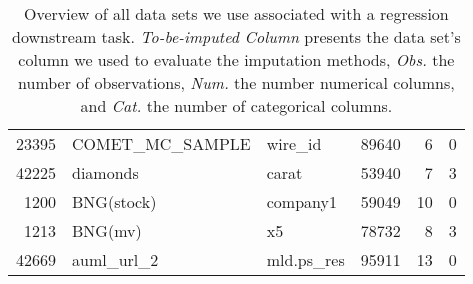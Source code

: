 \begin{table}[h!]
\begin{tabular}{rllrrr}
     23395 &     COMET\_MC\_SAMPLE &   wire\_id &     89640 &                6 &                0 \\
     42225 &            diamonds &    carat &    53940 &                7 &                3 \\
      1200 &          BNG(stock) &  company1 &      59049 &               10 &                0 \\
      1213 &             BNG(mv) &    x5 &    78732 &                8 &                3 \\
     42669 &          auml\_url\_2 &   mld.ps\_res &     95911 &               13 &                0 \\
\bottomrule
\end{tabular}
\caption{Overview of all data sets we use associated with a regression downstream task. \emph{To-be-imputed Column} presents the data set's column we used to evaluate the imputation methods, \emph{Obs.} the number of observations, \emph{Num.} the number numerical columns, and \emph{Cat.} the number of categorical columns.}
\label{tab:regression_data}
\end{table}
